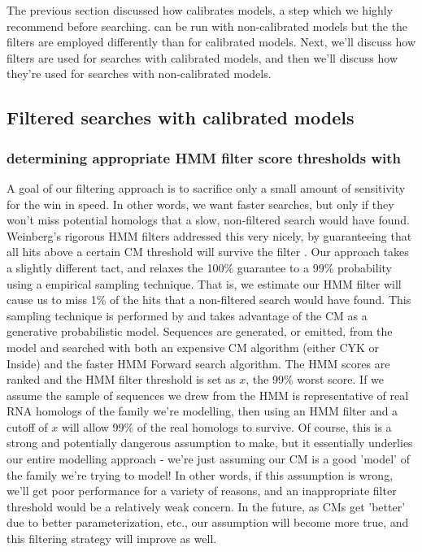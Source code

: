 The previous section discussed how  calibrates
models, a step which we highly recommend before searching.
 can be run with non-calibrated models but the the
filters are employed differently than for calibrated models.  Next,
we'll discuss how filters are used for searches with calibrated
models, and then we'll discuss how they're used for searches with
non-calibrated models.

\subsection{Filtered searches with calibrated models}

\subsubsection{determining appropriate HMM filter score thresholds with }
A goal of our filtering approach is to sacrifice only a small amount
of sensitivity for the win in speed. In other words, we want faster
searches, but only if they won't miss potential homologs that a slow,
non-filtered search would have found.  Weinberg's rigorous HMM filters
addressed this very nicely, by guaranteeing that all hits above a
certain CM threshold will survive the filter
\cite{WeinbergRuzzo04}. Our approach takes a slightly different tact,
and relaxes the 100\% guarantee to a 99\% probability using a
empirical sampling technique. That is, we estimate our HMM filter will
cause us to miss 1\% of the hits that a non-filtered search would have
found. This sampling technique is performed by  and
takes advantage of the CM as a generative probabilistic model.
Sequences are generated, or emitted, from the model and searched with
both an expensive CM algorithm (either CYK or Inside) and the faster
HMM Forward search algorithm. The HMM scores are ranked and the HMM
filter threshold is set as $x$, the 99\% worst score. If we assume
the sample of sequences we drew from the HMM is representative of real
RNA homologs of the family we're modelling, then using an HMM filter
and a cutoff of $x$ will allow 99\% of the real homologs to
survive. Of course, this is a strong and potentially dangerous
assumption to make, but it essentially underlies our entire modelling
approach - we're just assuming our CM is a good 'model' of the family
we're trying to model!  In other words, if this assumption is wrong,
we'll get poor performance for a variety of reasons, and an
inappropriate filter threshold would be a relatively weak concern.  In
the future, as CMs get 'better' due to better parameterization, etc.,
our assumption will become more true, and this filtering strategy will
improve as well. 

